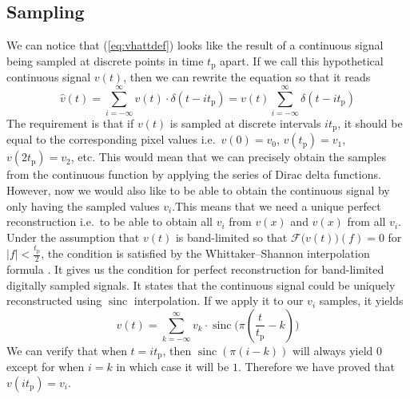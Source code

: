 \documentclass[a4paper,12pt,twoside,openright]{report}
\begin{document}
\subsection{Sampling}
We can notice that (\ref{eq:vhattdef}) looks like the result of a continuous signal being sampled at discrete points in time $t_\text{p}$ apart. If we call this hypothetical continuous signal $v(t)$, then we can rewrite the equation so that it reads
\begin{equation}
\hat{v}(t) = \sum\limits_{i=-\infty}^{\infty} v(t) \cdot \delta(t-i t_\text{p}) = v(t) \sum\limits_{i=-\infty}^{\infty} \delta(t-i t_\text{p})
\end{equation}
The requirement is that if $v(t)$ is sampled at discrete intervals $i t_\text{p}$, it should be equal to the corresponding pixel values i.e.\  $v(0)=v_{0}$, $v(t_\text{p})=v_{1}$, $v(2 t_\text{p})=v_{2}$, etc. This would mean that we can precisely obtain the samples from the continuous function by applying the series of Dirac delta functions. However, now we would also like to be able to obtain the continuous signal by only having the sampled values $v_{i}$.This means that we need a unique perfect reconstruction i.e.\  to be able to obtain all $v_{i}$ from $v(x)$ and $v(x)$ from all $v_{i}$. Under the assumption that $v(t)$ is band-limited so that $\mathcal{F}\big( v(t) \big)(f) = 0$ for $|f| < \frac{t_\text{p}}{2}$, the condition is satisfied by the Whittaker--Shannon interpolation formula \cite{shannon1949communication}. It gives us the condition for perfect reconstruction for band-limited digitally sampled signals. It states that the continuous signal could be uniquely reconstructed using $\operatorname{sinc}$ interpolation. If we apply it to our $v_{i}$ samples, it yields
\begin{equation}
v(t) = \sum\limits_{k=-\infty}^{\infty} v_{k} \cdot \operatorname{sinc} \Bigg( \pi \left( \frac{t}{t_\text{p}} - k \right) \Bigg)
\end{equation}
We can verify that when $t=i t_\text{p}$, then $\operatorname{sinc}(\pi (i-k) )$ will always yield $0$ except for when $i = k$ in which case it will be $1$. Therefore we have proved that $v(i t_\text{p}) = v_{i}$.
\end{document}

